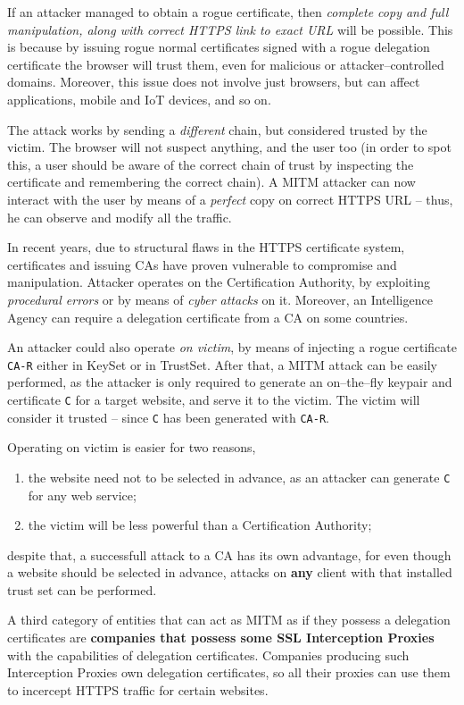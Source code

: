 \documentclass[10pt]{extbook}
\begin{document}
If an attacker managed to obtain a rogue certificate, then \emph{complete copy
and full manipulation, along with correct HTTPS link to exact URL} will be
possible. This is because by issuing rogue normal certificates signed with a
rogue delegation certificate the browser will trust them, even for malicious or
attacker\---controlled domains. Moreover, this issue does not involve just
browsers, but can affect applications, mobile and IoT devices, and so on.

The attack works by sending a \emph{different} chain, but considered trusted by
the victim. The browser will not suspect anything, and the user too (in order
to spot this, a user should be aware of the correct chain of trust by
inspecting the certificate and remembering the correct chain). A MITM attacker
can now interact with the user by means of a \emph{perfect} copy on correct
HTTPS URL -- thus, he can observe and modify all the traffic.

In recent years, due to structural flaws in the HTTPS certificate system,
certificates and issuing CAs have proven vulnerable to compromise and
manipulation. Attacker operates on the Certification Authority, by exploiting
\emph{procedural errors} or by means of \emph{cyber attacks} on it. Moreover,
an Intelligence Agency can require a delegation certificate from a CA on some
countries.

An attacker could also operate \emph{on victim}, by means of injecting a rogue
certificate \texttt{CA-R} either in KeySet or in TrustSet. After that, a MITM
attack can be easily performed, as the attacker is only required to generate an
on--the--fly keypair and certificate \texttt{C} for a target website, and serve
it to the victim. The victim will consider it trusted -- since \texttt{C} has
been generated with \texttt{CA-R}.

Operating on victim is easier for two reasons,
\begin{enumerate}
    \item the website need not to be selected in advance, as an attacker can
        generate \texttt{C} for any web service;
    \item the victim will be less powerful than a Certification Authority;
\end{enumerate}
despite that, a successfull attack to a CA has its own advantage, for even
though a website should be selected in advance, attacks on \textbf{any} client
with that installed trust set can be performed.

A third category of entities that can act as MITM as if they possess a
delegation certificates are \textbf{companies that possess some SSL
Interception Proxies} with the capabilities of delegation certificates.
Companies producing such Interception Proxies own delegation certificates, so
all their proxies can use them to incercept HTTPS traffic for certain websites.
\end{document}
